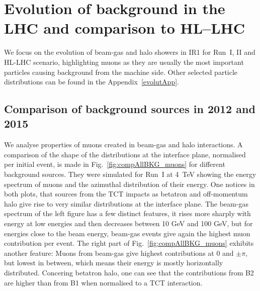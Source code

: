 \newpage
\section{Evolution of background in the LHC and comparison to HL--LHC\label{evolut}}

We focus on the evolution of beam-gas and halo showers in IR1 for Run~I, II and HL-LHC scenario, highlighting muons as they are usually the most important particles causing background from the machine side. Other selected particle distributions can be found in the Appendix~\ref{evolutApp}.

\subsection{Comparison of background sources in 2012 and 2015}


We analyse properties of muons created in beam-gas and halo interactions. A comparison of the shape of the distributions at the interface plane, normalised per initial event, is made in Fig.~\ref{fig:compAllBKG_muons} for different background sources. They were simulated for Run~I at 4~TeV showing the energy spectrum of muons and the azimuthal distribution of their energy. One notices in both plots, that sources from the TCT impacts as betatron and off-momentum halo give rise to very similar distributions at the interface plane. The beam-gas spectrum of the left figure has a few distinct features, it rises more sharply with energy at low energies and then decreases between 10 GeV and 100 GeV, but for energies close to the beam energy, beam-gas events give again the highest muon contribution per event. The right part of Fig.~\ref{fig:compAllBKG_muons} exhibits another feature: Muons from beam-gas give highest contributions at $0$ and $\pm \pi$, but lowest in between, which means their energy is mostly horizontally distributed. Concering betatron halo, one can see that the contributions from B2 are higher than from B1 when normalised to a TCT interaction.\\

